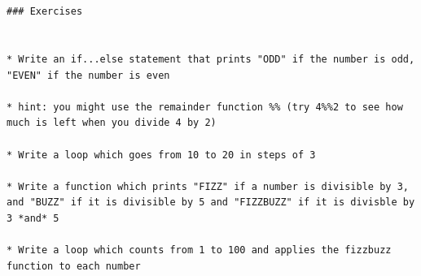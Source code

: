 \documentclass[]{book}
\begin{document}
\begin{verbatim}
                                                                                                                                                                                                                                                          
                                                                                                                                                                                                                                                          ### Exercises
                                                                                                                                                                                                                                                          
                                                                                                                                                                                                                                                          * Write an if...else statement that prints "ODD" if the number is odd, "EVEN" if the number is even
                                                                                                                                                                                                                                                          * hint: you might use the remainder function %% (try 4%%2 to see how much is left when you divide 4 by 2)
                                                                                                                                                                                                                                                          * Write a loop which goes from 10 to 20 in steps of 3
                                                                                                                                                                                                                                                          * Write a function which prints "FIZZ" if a number is divisible by 3, and "BUZZ" if it is divisible by 5 and "FIZZBUZZ" if it is divisble by 3 *and* 5
                                                                                                                                                                                                                                                          * Write a loop which counts from 1 to 100 and applies the fizzbuzz function to each number
                                                                                                                                                                                                                                                          

\end{verbatim}
\end{document}
